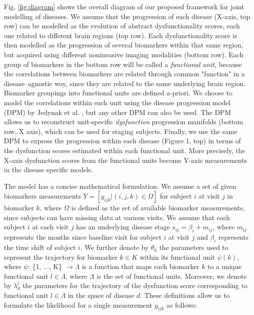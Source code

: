 Fig. \ref{fig:diagram} shows the overall diagram of our proposed framework for joint modelling of diseases. We assume that the progression of each disease (X-axis, top row) can be modelled as the evolution of abstract dysfunctionality scores, each one related to different brain regions (top row). Each dysfunctionality score is then modelled as the progression of several biomarkers within that same region, but acquired using different noninvasive imaging modalities (bottom row). Each group of biomarkers in the bottom row will be called a \emph{functional unit}, because the correlations between biomarkers are related through common "function" in a disease--agnostic way, since they are related to the same underlying brain region. Biomarker groupings into functional units are defined a-priori. We choose to model the correlations within each unit using the disease progression model (DPM) by Jedynak et al. \cite{jedynak2012computational}, but any other DPM can also be used. The DPM allows us to reconstruct unit-specific \emph{dysfunction} progression manifolds (bottom row, X axis), which can be used for staging subjects. Finally, we use the same DPM to express the progression within each disease (Figure 1, top) in terms of the dysfunction scores estimated within each functional unit. More precisely, the X-axis dysfunction scores from the functional units become Y-axis measurements in the disease specific models.

The model has a concise mathematical formulation. We assume a set of given biomarkers measurements $Y = [y_{ijk} | (i,j,k) \in \Omega]$ for subject $i$ at visit $j$ in biomarker $k$, where $\Omega$ is defined as the set of available biomarker measurements, since subjects can have missing data at various visits. We assume that each subject $i$ at each visit $j$ has an underlying disease stage $s_{ij} = \beta_i + m_{ij}$, where $m_{ij}$ represents the months since baseline visit for subject $i$ at visit $j$ and $\beta_i$ represents the time shift of subject $i$. We further denote by $\theta_k$ the parameters used to represent the trajectory for biomarker $k \in K$ within its functional unit $\psi(k)$, where $\psi$: \{1, ..., K\} $ \rightarrow \Lambda$ is a function that maps each biomarker $k$ to a unique functional unit $l \in \Lambda$, where $\Lambda$ is the set of functional units. Moreover, we denote by $\lambda_d^l$ the parameters for the trajectory of the dysfunction score corresponding to functional unit $l \in \Lambda$ in the space of disease $d$. These definitions allow us to formulate the likelihood for a single measurement $y_{ijk}$ as follows:

